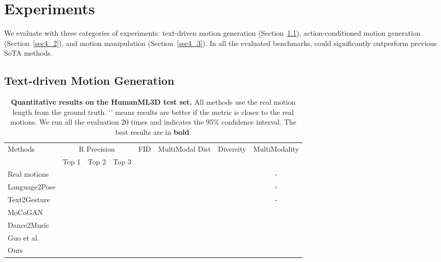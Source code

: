 \section{Experiments}\label{sec4}



We evaluate \name with three categories of experiments: 
text-driven motion generation (Section~\ref{sec4_1}), action-conditioned motion generation (Section~\ref{sec4_2}), 
and motion manipulation (Section~\ref{sec4_3}).
In all the evaluated benchmarks, \name could significantly outperform previous SoTA methods.

\subsection{Text-driven Motion Generation}\label{sec4_1}

\begin{table*}[ht]
\centering
\caption{\textbf{Quantitative results on the HumanML3D test set.} All methods use the real motion length from the ground truth. `' means results are better if the metric is closer to the real motions. We run all the evaluation 20 times and  indicates the 95\% confidence interval. The best results are in \textbf{bold}.}
\label{tab:humanml3d}
\setlength{\tabcolsep}{1.4mm}
{
\begin{tabular}{lccccccc}
\hline

\multirow{2}{2cm}{\centering Methods} & \multicolumn{3}{c}{\centering R Precision} & \multirow{2}{1.5cm}{\centering FID} & \multirow{2}{2.5cm}{\centering MultiModal Dist} & \multirow{2}{2cm}{\centering Diversity} & \multirow{2}{2cm}{\centering MultiModality} \\
& Top 1 & Top 2 & Top 3 \\
\hline
Real motions &  &  &  &  &  &  & -\\ 
\hline

Language2Pose &  &  &  &  &  &  & - \\

Text2Gesture &  &  &  &  &  &  & - \\

MoCoGAN &  &  &  &  &  &  &
 \\

Dance2Music &  &  &  &  &  &  &  \\

Guo et al. &  &  &  &  &  &  &  \\
\hline
Ours &  &  &  &  &  &  &  \\
\hline
\end{tabular}}
\end{table*}

